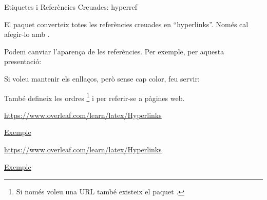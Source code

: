 \begin{frame}[fragile]{Etiquetes i Referències Creuades: hyperref}
\begin{itemize}{\small
\item El paquet  converteix totes les referències creuades en ``hyperlinks''. Només cal afegir-lo amb .
\item Podem canviar l'aparença de les referències. Per exemple, per aquesta presentació:
\begin{exampletiny}
\usepackage{hyperref}
\hypersetup{colorlinks,breaklinks,urlcolor=magenta,linkcolor=black}
\end{exampletiny}
\item Si voleu mantenir els enllaços, però sense cap color, feu servir:
\begin{exampletiny}
\hypersetup{hidelinks=true}
\end{exampletiny}

\item També defineix les ordres \footnote{Si només voleu una URL també existeix el paquet .}
    i  per referir-se a pàgines web.
}\end{itemize}
\begin{exampletiny}
\url{https://www.overleaf.com/learn/latex/Hyperlinks}

\href{https://www.overleaf.com/learn/latex/Hyperlinks}{Exemple}
\end{exampletiny}

\url{https://www.overleaf.com/learn/latex/Hyperlinks}

\href{https://www.overleaf.com/learn/latex/Hyperlinks}{Exemple}
\end{frame}


